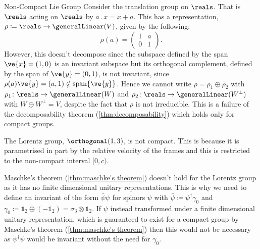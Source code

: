 \documentclass[fleqn]{NotesClass}
\newcommand*{\action}{\mathbin{.}}
\newcommand*{\hermit}{\dagger}
\newcommand*{\ident}{\mathbb{1}}
\newcommand*{\directsum}{\oplus}
\newcommand*{\directproduct}{\otimes}
\DeclareMathOperator{\spn}{span}
\begin{document}
    \begin{exm}{Non-Compact Lie Group}{}
        Consider the translation group on \(\reals\).
        That is \(\reals\) acting on \(\reals\) by \(a \action x = x + a\).
        This has a representation, \(\rho \coloneqq \reals \to \generalLinear(V)\), given by the following:
        \begin{equation}
            \rho(a) =
            \begin{pmatrix}
                1 & a\\ 0 & 1
            \end{pmatrix}
            .
        \end{equation}
        However, this doesn't decompose since the subspace defined by the span \(\ve{x} = (1, 0)\) is an invariant subspace but its orthogonal complement, defined by the span of \(\ve{y} = (0, 1)\), is not invariant, since \(\rho(a)\ve{y} = (a, 1) \notin \spn \{\ve{y}\}\).
        Hence we cannot write \(\rho = \rho_1 \directsum \rho_2\) with \(\rho_1 \colon \reals \to \generalLinear(W)\) and \(\rho_2 \colon \reals \to \generalLinear(W^{\bot})\) with \(W \directsum W^{\bot} = V\), despite the fact that \(\rho\) is not irreducible.
        This is a failure of the decomposability theorem (\cref{thm:decomposability}) which holds only for compact groups.
    \end{exm}
    
    \begin{exm}{}{}
        The Lorentz group, \(\orthogonal(1, 3)\), is not compact.
        This is because it is parametrised in part by the relative velocity of the frames and this is restricted to the non-compact interval \([0, c)\).
        
        Maschke's theorem (\cref{thm:maschke's theorem}) doesn't hold for the Lorentz group as it has no finite dimensional unitary representations.
        This is why we need to define an invariant of the form \(\bar{\psi}\psi\) for spinors \(\psi\) with \(\bar{\psi} \coloneqq \psi^\hermit \gamma_0\) and \(\gamma_0 \coloneqq \ident_2 \directsum (-\ident_2) = \sigma_3 \directproduct \ident_2\).
        If \(\psi\) instead transformed under a finite dimensional unitary representation, which is guaranteed to exist for a compact group by Maschke's theorem (\cref{thm:maschke's theorem}) then this would not be necessary as \(\psi^\hermit \psi\) would be invariant without the need for \(\gamma_0\).
    \end{exm}
    
\end{document}
